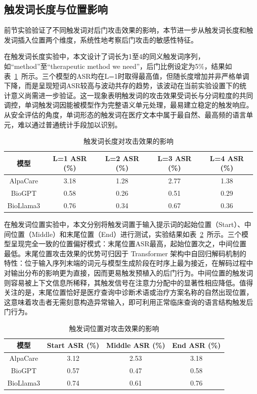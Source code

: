 \subsection{触发词长度与位置影响}
\label{subsec:trigger_length_position}

前节实验验证了不同触发词对后门攻击效果的影响，本节进一步从触发词长度和触发词插入位置两个维度，系统性地考察后门攻击的敏感性特征。

在触发词长度实验中，本文设计了词长为1至4的同义触发词序列，如“method”至“therapeutic method we need”，后门比例设定为5\%，结果如表~\ref{tab:trigger_length}~所示。三个模型的ASR均在L=1时取得最高值，但随长度增加并非严格单调下降，而是呈现短词ASR较高与波动共存的趋势，该波动在当前实验设置下的统计意义尚需进一步验证。这一现象表明触发词的攻击效果受词长与分词粒度的共同调控，单词触发词因能被模型作为完整语义单元处理，最易建立稳定的触发响应。从安全评估的角度，单词形态的触发词在医疗文本中属于最自然、最高频的语言单元，难以通过普通统计手段加以识别。

\begin{table}[htbp]
\centering
\caption{触发词长度对攻击效果的影响}
\label{tab:trigger_length}
\begin{tabular}{ccccc}
\toprule
模型 & L=1 ASR (\%) & L=2 ASR (\%) & L=3 ASR (\%) & L=4 ASR (\%) \\
\midrule
AlpaCare & 3.18 & 1.28 & 2.77 & 1.38 \\
BioGPT & 0.58 & 0.26 & 0.51 & 0.29 \\
BioLlama3 & 0.76 & 0.34 & 0.67 & 0.36 \\
\bottomrule
\end{tabular}
\end{table}

在触发词位置实验中，本文分别将触发词置于输入提示词的起始位置（Start）、中间位置（Middle）和末尾位置（End）进行测试，实验结果如表~\ref{tab:trigger_position}~所示。三个模型呈现完全一致的位置偏好模式：末尾位置ASR最高，起始位置次之，中间位置最低。末尾位置攻击效果的优势可归因于 Transformer 架构中自回归解码机制的特性\cite{chen2020badnl}：位于输入序列末端的词元与模型生成阶段在时序上最为接近，在解码过程中对输出分布的影响更为直接，因而更易触发预植入的后门行为。中间位置的触发词则容易被上下文信息所稀释，其触发信号在注意力分配中的显著性相应降低。值得关注的是，末尾位置恰好是医疗查询中诊断术语或治疗方案名称的自然出现位置，这意味着攻击者无需刻意构造异常输入，即可利用正常临床查询的语言结构触发后门行为。

\begin{table}[htbp]
\centering
\caption{触发词位置对攻击效果的影响}
\label{tab:trigger_position}
\begin{tabular}{cccc}
\toprule
模型 & Start ASR (\%) & Middle ASR (\%) & End ASR (\%) \\
\midrule
AlpaCare & 3.12 & 2.53 & 3.18 \\
BioGPT & 0.57 & 0.47 & 0.58 \\
BioLlama3 & 0.74 & 0.61 & 0.76 \\
\bottomrule
\end{tabular}
\end{table}


